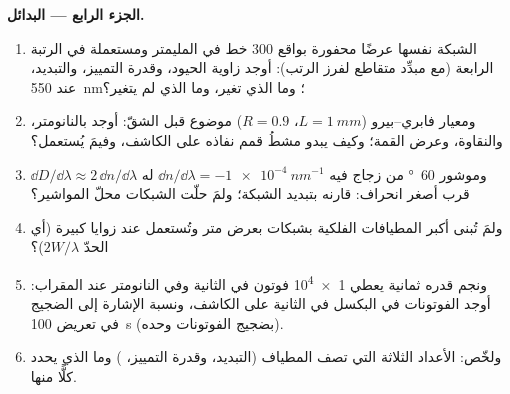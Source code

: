 \begin{problem}
\medskip
\noindent\textbf{الجزء الرابع --- البدائل.}
\begin{enumerate}[resume]
  \item الشبكة نفسها عرضًا محفورة بواقع $300$ خط في المليمتر ومستعملة في
        الرتبة الرابعة (مع مبدِّد متقاطع لفرز الرتب):
        أوجد زاوية الحيود، وقدرة التمييز، والتبديد،  عند \qty{550}{nm}؛ وما الذي تغير، وما الذي لم يتغير؟
  \item ومعيار فابري--بيرو ($L = \qty{1}{mm}$، $R = 0.9$) موضوع قبل
        الشقّ: أوجد  بالنانومتر، والنقاوة، وعرض القمة؛ وكيف
        يبدو مشطُ قمم نفاذه على الكاشف،
        وفيمَ يُستعمل؟
  \item وموشور \qty{60}{\degree} من زجاج فيه $\dd n/\dd\lambda = \qty{-1e-4}{nm^{-1}}$
        له  $\dd D/\dd\lambda \approx 2\,\dd n/\dd\lambda$ قرب
        أصغر انحراف: قارنه بتبديد الشبكة؛ ولمَ حلّت الشبكات
        محلّ المواشير؟
  \item ولمَ تُبنى أكبر المطيافات الفلكية بشبكات
        بعرض متر وتُستعمل عند زوايا كبيرة (أي الحدّ
        $2W/\lambda$)؟
  \item ونجم قدره ثمانية يعطي \qty{1e4}{} فوتون في الثانية
        وفي النانومتر عند المقراب: أوجد الفوتونات في البكسل في الثانية
        على الكاشف، ونسبة الإشارة إلى الضجيج في تعريض \qty{100}{s}
        (بضجيج الفوتونات وحده).
  \item ولخّص: الأعداد الثلاثة التي تصف المطياف
        (التبديد، وقدرة التمييز، ) وما الذي يحدد كلًّا منها.
\end{enumerate}
\end{problem}
